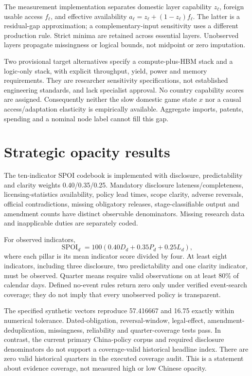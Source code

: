 \documentclass[11pt]{article}
\begin{document}
The measurement implementation separates domestic layer capability $z_\ell$, foreign usable access $f_\ell$, and effective availability $a_\ell=z_\ell+(1-z_\ell)f_\ell$. The latter is a residual-gap approximation; a complementary-input sensitivity uses a different production rule. Strict minima are retained across essential layers. Unobserved layers propagate missingness or logical bounds, not midpoint or zero imputation.

Two provisional target alternatives specify a compute-plus-HBM stack and a logic-only stack, with explicit throughput, yield, power and memory requirements. They are researcher sensitivity specifications, not established engineering standards, and lack specialist approval. No country capability scores are assigned. Consequently neither the slow domestic game state $x$ nor a causal access/adaptation elasticity is empirically available. Aggregate imports, patents, spending and a nominal node label cannot fill this gap.

\section{Strategic opacity results}
The ten-indicator SPOI codebook is implemented with disclosure, predictability and clarity weights 0.40/0.35/0.25. Mandatory disclosure lateness/completeness, licensing-statistics availability, policy lead times, scope clarity, adverse reversals, official contradictions, missing obligatory releases, stage-classifiable output and amendment counts have distinct observable denominators. Missing research data and inapplicable duties are separately coded.

For observed indicators,
\begin{equation}
 \operatorname{SPOI}_d=100(0.40D_d+0.35P_d+0.25L_d),
\end{equation}
where each pillar is its mean indicator score divided by four. At least eight indicators, including three disclosure, two predictability and one clarity indicator, must be observed. Quarter means require valid observations on at least 80\% of calendar days. Defined no-event rules return zero only under verified event-search coverage; they do not imply that every unobserved policy is transparent.

The specified synthetic vectors reproduce 57.416667 and 16.75 exactly within numerical tolerance. Dated-obligation, reversal-window, legal-effect, amendment-deduplication, missingness, reliability and quarter-coverage tests pass. In contrast, the current primary China-policy corpus and required disclosure denominators do not support a coverage-valid historical headline index. There are zero valid historical quarters in the executed coverage audit. This is a statement about evidence coverage, not measured high or low Chinese opacity.
\end{document}

